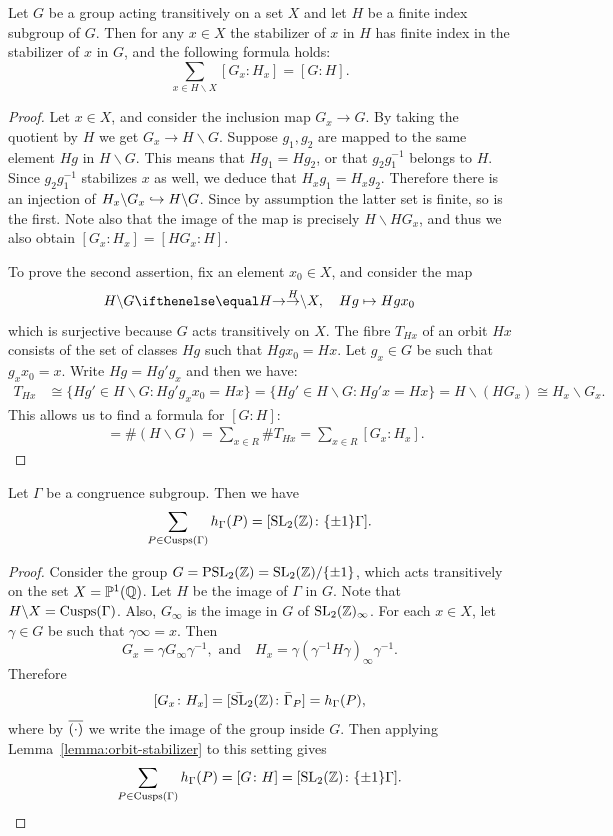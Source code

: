 \begin{lemma}
  \label{lemma:orbit-stabilizer}
Let $G$ be a group acting transitively on a set $X$ and let $H$ be a finite index subgroup of $G$. Then for any $x\in X$ the stabilizer of $x$ in $H$ has finite index in the stabilizer of $x$ in $G$, and the following formula holds:
\[
\sum_{x\in H\backslash X} [G_x\colon H_x]=[G\colon H].
\]
\end{lemma}
\begin{proof}
  Let $x\in X$, and consider the inclusion map $G_x\to G$. By taking the quotient by $H$ we get $G_x\to H\backslash G$. Suppose $g_1, g_2$ are mapped to the same element $Hg$ in $H\backslash G$. This means that $Hg_1 = Hg_2$, or that $g_2g_1^{-1}$ belongs to $H$. Since $g_2g_1^{-1}$ stabilizes $x$ as well, we deduce that $H_x g_1 = H_x g_2$. Therefore there is an injection of $H_x\backslash G_x\hookrightarrow H\backslash G$. Since by assumption the latter set is finite, so is the first. Note also that the image of the map is precisely $H\backslash HG_x$, and thus we also obtain $[G_x\colon H_x] = [H G_x\colon H]$.

To prove the second assertion, fix an element $x_0\in X$, and consider the map
\[
H\backslash G\tto H\backslash X,\quad Hg\mapsto Hgx_0
\]
which is surjective because $G$ acts transitively on $X$. The fibre $T_{Hx}$ of an orbit $Hx$ consists of the set of classes $Hg$ such that $Hgx_0 = Hx$. Let $g_x\in G$ be such that $g_x x_0 = x$. Write $Hg = Hg'g_x$ and then we have:
\begin{align*}
T_{Hx}&\cong \{Hg'\in H\backslash G\colon Hg'g_xx_0 = Hx\} = \{Hg'\in H\backslash G\colon Hg'x=Hx\}= H\backslash(H G_x)\cong H_x\backslash G_x.
\end{align*}
This allows us to find a formula for $[G\colon H]$:
\begin{align*}
[G\colon H]&=\# (H\backslash G) = \sum_{x\in R} \# T_{Hx} = \sum_{x\in R} [G_x\colon H_x].
\end{align*}
\end{proof}

\begin{theorem}
  Let $\Gamma$ be a congruence subgroup. Then we have
\[
\sum_{P\in \operatorname{Cusps}(\Gamma)} h_\Gamma(P) = [\operatorname{SL}_2(\mathbb{Z})\colon \{\pm 1\}\Gamma].
\]
\end{theorem}
\begin{proof}
  Consider the group $G=\operatorname{PSL}_2(\mathbb{Z})=\operatorname{SL}_2(\mathbb{Z})/\{\pm 1\}$, which acts transitively on the set $X=\mathbb{P}^1(\mathbb{Q})$. Let $H$ be the image of $\Gamma$ in $G$. Note that $H\backslash X=\operatorname{Cusps}(\Gamma)$. Also, $G_\infty$ is the image in $G$ of $\operatorname{SL}_2(\mathbb{Z})_\infty$. For each $x\in X$, let $\gamma\in G$ be such that $\gamma \infty = x$. Then
\[
G_x=\gamma G_\infty\gamma^{-1},\text{ and}\quad H_x= \gamma \left(\gamma^{-1}H\gamma\right)_\infty \gamma^{-1}.
\]
Therefore
\[
[G_x\colon H_x] = [\bar{\operatorname{SL}}_2(\mathbb{Z})\colon \bar \Gamma_P] = h_\Gamma(P),
\]
where by $\overline{(\cdot)}$ we write the image of the group inside $G$. Then applying Lemma~\ref{lemma:orbit-stabilizer} to this setting gives
\[
\sum_{P\in \operatorname{Cusps}(\Gamma)} h_\Gamma(P) = [G\colon H] = [\operatorname{SL}_2(\mathbb{Z})\colon \{\pm 1\}\Gamma].
\]
\end{proof}
